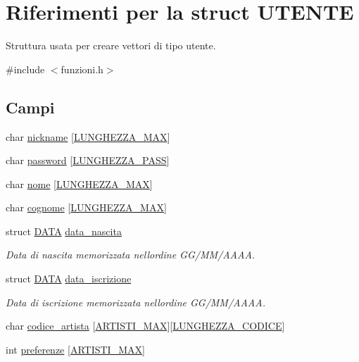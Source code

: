 \hypertarget{struct_u_t_e_n_t_e}{}\section{Riferimenti per la struct U\+T\+E\+N\+TE}
\label{struct_u_t_e_n_t_e}


Struttura usata per creare vettori di tipo utente.  




{\ttfamily \#include $<$funzioni.\+h$>$}

\subsection*{Campi}
\begin{DoxyCompactItemize}
\item 
char \hyperlink{struct_u_t_e_n_t_e_a0ae0027764658fd60ce899a829b7b2fe}{nickname} \mbox{[}\hyperlink{funzioni_8h_a2cdd71b92d6e869f8b094e32a6da6a62}{L\+U\+N\+G\+H\+E\+Z\+Z\+A\+\_\+\+M\+AX}\mbox{]}
\item 
char \hyperlink{struct_u_t_e_n_t_e_a04d8337f5e0fe9cd44d36cbe7dac7415}{password} \mbox{[}\hyperlink{funzioni_8h_a21981b6e8c0f57093d564c3df476f9ee}{L\+U\+N\+G\+H\+E\+Z\+Z\+A\+\_\+\+P\+A\+SS}\mbox{]}
\item 
char \hyperlink{struct_u_t_e_n_t_e_acd2869ae6d739de9978a588124906ae8}{nome} \mbox{[}\hyperlink{funzioni_8h_a2cdd71b92d6e869f8b094e32a6da6a62}{L\+U\+N\+G\+H\+E\+Z\+Z\+A\+\_\+\+M\+AX}\mbox{]}
\item 
char \hyperlink{struct_u_t_e_n_t_e_ad7797bd318a25af80b02a7751ebd4b9a}{cognome} \mbox{[}\hyperlink{funzioni_8h_a2cdd71b92d6e869f8b094e32a6da6a62}{L\+U\+N\+G\+H\+E\+Z\+Z\+A\+\_\+\+M\+AX}\mbox{]}
\item 
struct \hyperlink{struct_d_a_t_a}{D\+A\+TA} \hyperlink{struct_u_t_e_n_t_e_aae6578862368788ad3bbc4af47a36ee0}{data\+\_\+nascita}
\begin{DoxyCompactList}\small\item\em Data di nascita memorizzata nell\textquotesingle{}ordine G\+G/\+M\+M/\+A\+A\+AA. \end{DoxyCompactList}\item 
struct \hyperlink{struct_d_a_t_a}{D\+A\+TA} \hyperlink{struct_u_t_e_n_t_e_adad490891a61a9c3d48062baa067c1e9}{data\+\_\+iscrizione}
\begin{DoxyCompactList}\small\item\em Data di iscrizione memorizzata nell\textquotesingle{}ordine G\+G/\+M\+M/\+A\+A\+AA. \end{DoxyCompactList}\item 
char \hyperlink{struct_u_t_e_n_t_e_a0c2bc40343dd678b5033f5c7084dfb43}{codice\+\_\+artista} \mbox{[}\hyperlink{funzioni_8h_af17e5297d3cc4c2db33d467698a1b9c2}{A\+R\+T\+I\+S\+T\+I\+\_\+\+M\+AX}\mbox{]}\mbox{[}\hyperlink{funzioni_8h_a15beac41f998f4495a79396160235665}{L\+U\+N\+G\+H\+E\+Z\+Z\+A\+\_\+\+C\+O\+D\+I\+CE}\mbox{]}
\item 
int \hyperlink{struct_u_t_e_n_t_e_a1b4dec4c7ed79c12a76501b634b71176}{preferenze} \mbox{[}\hyperlink{funzioni_8h_af17e5297d3cc4c2db33d467698a1b9c2}{A\+R\+T\+I\+S\+T\+I\+\_\+\+M\+AX}\mbox{]}
\end{DoxyCompactItemize}


